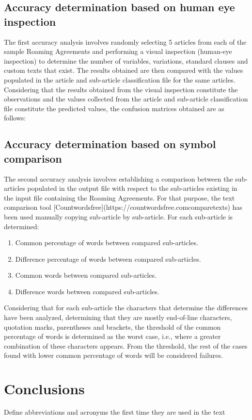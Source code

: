 \documentclass[conference]{style/IEEEtran}
\begin{document}
\subsection{Accuracy determination based on human eye inspection}
The first accuracy analysis involves randomly selecting 5 articles from each of the sample Roaming Agreements and performing a visual inspection (human-eye inspection) to determine the number of variables, variations, standard clauses and custom texts that exist. The results obtained are then compared with the values populated in the article and sub-article classification file for the same articles. Considering that the results obtained from the visual inspection constitute the observations and the values collected from the article and sub-article classification file constitute the predicted values, the confusion matrices obtained are as follows:

\subsection{Accuracy determination based on symbol comparison}
The second accuracy analysis involves establishing a comparison between the sub-articles populated in the output file with respect to the sub-articles existing in the input file containing the Roaming Agreements. For that purpose, the text comparison tool [Countwordsfree](https://countwordsfree.comcomparetexts) has been used manually copying sub-article by sub-article. For each sub-article is determined:
 \begin{enumerate}
\item Common percentage of words between compared sub-articles.
\item Difference percentage of words between compared sub-articles.
\item Common words between compared sub-articles.
\item Difference words between compared sub-articles.
\end{enumerate}

Considering that for each sub-article the characters that determine the differences have been analyzed, determining that they are mostly end-of-line characters, quotation marks, parentheses and brackets, the threshold of the common percentage of words is determined as the worst case, i.e., where a greater combination of these characters appears. From the threshold, the rest of the cases found with lower common percentage of words will be considered failures.

\section{Conclusions}
Define abbreviations and acronyms the first time they are used in the text 

\printbibliography

\vspace{12pt}
\end{document}
